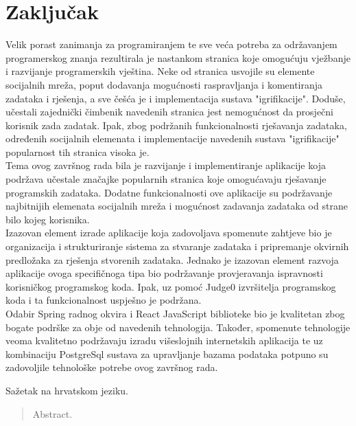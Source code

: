 \documentclass[times, utf8, zavrsni]{fer}
\begin{document}
	
	\chapter{Zaključak}
	Velik porast zanimanja za programiranjem te sve veća potreba za održavanjem programerskog znanja rezultirala je nastankom stranica koje omogućuju vježbanje i razvijanje programerskih vještina. Neke od stranica usvojile su elemente socijalnih mreža, poput dodavanja mogućnosti raspravljanja i komentiranja zadataka i rješenja, a sve češća je i implementacija sustava "igrifikacije". Doduše, učestali zajednički čimbenik navedenih stranica jest nemogućnost da prosječni korisnik zada zadatak. Ipak, zbog podržanih funkcionalnosti rješavanja zadataka, određenih socijalnih elemenata i implementacije navedenih sustava "igrifikacije" popularnost tih stranica visoka je.\\
	Tema ovog završnog rada bila je razvijanje i implementiranje aplikacije koja podržava učestale značajke popularnih stranica koje omogućavaju rješavanje programskih zadataka. Dodatne funkcionalnosti ove aplikacije su podržavanje najbitnijih elemenata socijalnih mreža i mogućnost zadavanja zadataka od strane bilo kojeg korisnika. \\
	Izazovan element izrade aplikacije koja zadovoljava spomenute zahtjeve bio je organizacija i strukturiranje sistema za stvaranje zadataka i pripremanje okvirnih predložaka za rješenja stvorenih zadataka. Jednako je izazovan element razvoja aplikacije ovoga specifičnoga tipa bio podržavanje provjeravanja ispravnosti korisničkog programskog koda. Ipak, uz pomoć Judge0 izvršitelja programskog koda i ta funkcionalnost uspješno je podržana.\\
	Odabir Spring radnog okvira i React JavaScript biblioteke bio je kvalitetan zbog bogate podrške za obje od navedenih tehnologija. Također, spomenute tehnologije veoma kvalitetno podržavaju izradu višeslojnih internetskih aplikacija te uz kombinaciju PostgreSql sustava za upravljanje bazama podataka potpuno su zadovoljile tehnološke potrebe ovog završnog rada.\\
	
	
	
	\nocite{react2021}
	\nocite{react-router2021}
	\nocite{bootstrap2021}
	\nocite{materialUI2021}
	\nocite{ace2021}
	\nocite{spring2021}
	\nocite{hibernate2021}
	\nocite{springsecurity2021}
	\nocite{springdatajpa2021}
	\nocite{axios2021}
	\nocite{git2021}
	\nocite{postgresql2021}
	\nocite{jjwt2021}
	\nocite{jwt2021}
	\nocite{judge02021}
	\nocite{websocket2021}
	
	
	
	\begin{sazetak}
		Sažetak na hrvatskom jeziku.
		
	\end{sazetak}
	
	\begin{abstract}
		Abstract.
		
	\end{abstract}
	
\end{document}
